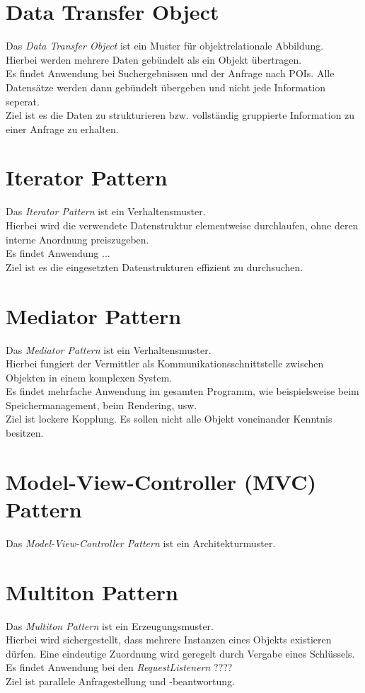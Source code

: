 \documentclass[10pt]{scrreprt}
\begin{document}
\section{Data Transfer Object}
Das \textit{Data Transfer Object} ist ein Muster für objektrelationale Abbildung. \\
Hierbei werden mehrere Daten gebündelt als ein Objekt übertragen. \\ Es findet Anwendung bei Suchergebnissen und der Anfrage nach POIs. Alle Datensätze werden dann gebündelt übergeben und nicht jede Information seperat. \\ Ziel ist es die Daten zu strukturieren bzw. vollständig gruppierte Information zu einer Anfrage zu erhalten.

\section{Iterator Pattern}
Das \textit{Iterator Pattern} ist ein Verhaltensmuster. \\ Hierbei wird die verwendete Datenstruktur elementweise durchlaufen, ohne deren interne Anordnung preiszugeben.\\ Es findet Anwendung ... \\ Ziel ist es die eingesetzten Datenstrukturen effizient zu durchsuchen.

\section{Mediator Pattern}
Das \textit{Mediator Pattern} ist ein Verhaltensmuster. \\ Hierbei fungiert der Vermittler als Kommunikationsschnittstelle zwischen Objekten in einem komplexen System. \\ Es findet mehrfache Anwendung im gesamten Programm, wie beispielsweise beim Speichermanagement, beim Rendering, usw. \\ Ziel ist lockere Kopplung. Es sollen nicht alle Objekt voneinander Kenntnis besitzen.

\section{Model-View-Controller (MVC) Pattern}
Das \textit{Model-View-Controller Pattern} ist ein Architekturmuster. \\



\section{Multiton Pattern}
Das \textit{Multiton Pattern} ist ein Erzeugungsmuster. \\ Hierbei wird sichergestellt, dass mehrere Instanzen eines Objekts existieren dürfen. Eine eindeutige Zuordnung wird geregelt durch Vergabe eines Schlüssels. \\ Es findet Anwendung bei den \textit{RequestListenern} ???? \\ Ziel ist parallele Anfragestellung und -beantwortung.
\end{document}
